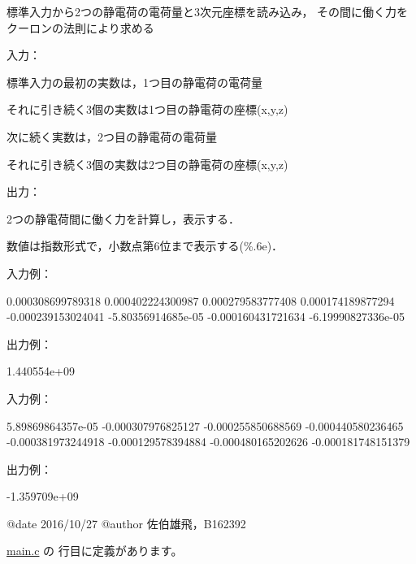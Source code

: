 標準入力から2つの静電荷の電荷量と3次元座標を読み込み， その間に働く力をクーロンの法則により求める

入力：
\begin{DoxyItemize}
\item 標準入力の最初の実数は，1つ目の静電荷の電荷量
\item それに引き続く3個の実数は1つ目の静電荷の座標(x,y,z)
\item 次に続く実数は，2つ目の静電荷の電荷量
\item それに引き続く3個の実数は2つ目の静電荷の座標(x,y,z)
\end{DoxyItemize}

出力：
\begin{DoxyItemize}
\item 2つの静電荷間に働く力を計算し，表示する．
\item 数値は指数形式で，小数点第6位まで表示する(\%.6e)．
\end{DoxyItemize}

入力例： \begin{DoxyVerb}0.000308699789318
0.000402224300987 0.000279583777408 0.000174189877294
-0.000239153024041
-5.80356914685e-05 -0.000160431721634 -6.19990827336e-05
\end{DoxyVerb}
 出力例： \begin{DoxyVerb}1.440554e+09
\end{DoxyVerb}
 入力例： \begin{DoxyVerb}5.89869864357e-05
-0.000307976825127 -0.000255850688569 -0.000440580236465
-0.000381973244918
-0.000129578394884 -0.000480165202626 -0.000181748151379
\end{DoxyVerb}
 出力例： \begin{DoxyVerb}-1.359709e+09
\end{DoxyVerb}
 \begin{DoxyVerb}@date   2016/10/27
@author 佐伯雄飛，B162392\end{DoxyVerb}
 

 \hyperlink{main_8c_source}{main.\-c} の  行目に定義があります。


